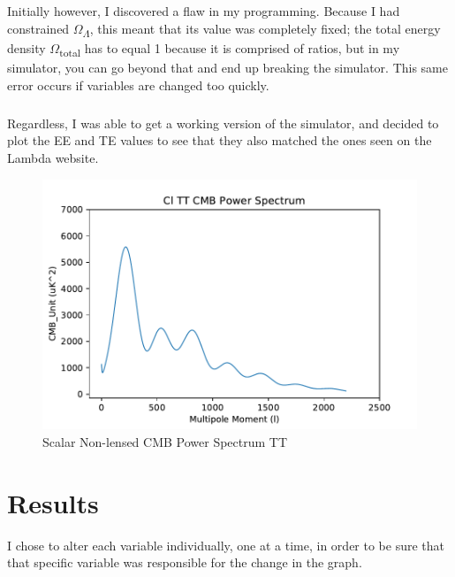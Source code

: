 \documentclass[twoside, fontsize=12pt,
     bibliography=totoc, %
     listof=totoc, %
     index=totoc, %
     onehalfspacing %
]{_MScDiss2017_cls}
\begin{document}
\paragraph{}

Initially however, I discovered a flaw in my programming. Because I had constrained $\Omega$\textsubscript{$\Lambda$}, this meant that its value was completely fixed; the total energy density $\Omega$\textsubscript{total} has to equal 1 because it is comprised of ratios, but in my simulator, you can go beyond that and end up breaking the simulator. This same error occurs if variables are changed too quickly.

\paragraph{}

Regardless, I was able to get a working version of the simulator, and decided to plot the EE and TE values to see that they also matched the ones seen on the Lambda website.

\label{sec:template}

\begin{figure}[t]
  \begin{center}
  \includegraphics{2Cl-TT-vs-l.pdf}
  \caption{Scalar Non-lensed CMB Power Spectrum TT} 
  \label{fig:TT}
  \end{center}
\end{figure}

\chapter{Results}

I chose to alter each variable individually, one at a time, in order to be sure that that specific variable was responsible for the change in the graph.
\end{document}

